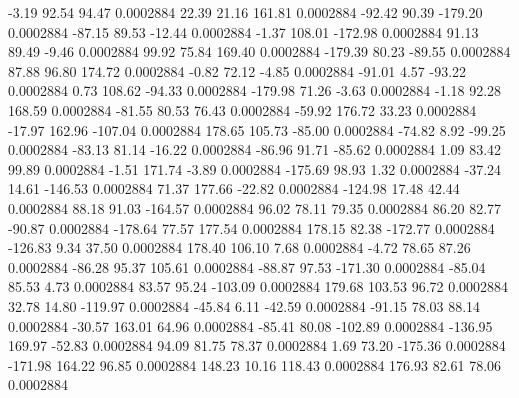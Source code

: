        -3.19       92.54       94.47     0.0002884
       22.39       21.16      161.81     0.0002884
      -92.42       90.39     -179.20     0.0002884
      -87.15       89.53      -12.44     0.0002884
       -1.37      108.01     -172.98     0.0002884
       91.13       89.49       -9.46     0.0002884
       99.92       75.84      169.40     0.0002884
     -179.39       80.23      -89.55     0.0002884
       87.88       96.80      174.72     0.0002884
       -0.82       72.12       -4.85     0.0002884
      -91.01        4.57      -93.22     0.0002884
        0.73      108.62      -94.33     0.0002884
     -179.98       71.26       -3.63     0.0002884
       -1.18       92.28      168.59     0.0002884
      -81.55       80.53       76.43     0.0002884
      -59.92      176.72       33.23     0.0002884
      -17.97      162.96     -107.04     0.0002884
      178.65      105.73      -85.00     0.0002884
      -74.82        8.92      -99.25     0.0002884
      -83.13       81.14      -16.22     0.0002884
      -86.96       91.71      -85.62     0.0002884
        1.09       83.42       99.89     0.0002884
       -1.51      171.74       -3.89     0.0002884
     -175.69       98.93        1.32     0.0002884
      -37.24       14.61     -146.53     0.0002884
       71.37      177.66      -22.82     0.0002884
     -124.98       17.48       42.44     0.0002884
       88.18       91.03     -164.57     0.0002884
       96.02       78.11       79.35     0.0002884
       86.20       82.77      -90.87     0.0002884
     -178.64       77.57      177.54     0.0002884
      178.15       82.38     -172.77     0.0002884
     -126.83        9.34       37.50     0.0002884
      178.40      106.10        7.68     0.0002884
       -4.72       78.65       87.26     0.0002884
      -86.28       95.37      105.61     0.0002884
      -88.87       97.53     -171.30     0.0002884
      -85.04       85.53        4.73     0.0002884
       83.57       95.24     -103.09     0.0002884
      179.68      103.53       96.72     0.0002884
       32.78       14.80     -119.97     0.0002884
      -45.84        6.11      -42.59     0.0002884
      -91.15       78.03       88.14     0.0002884
      -30.57      163.01       64.96     0.0002884
      -85.41       80.08     -102.89     0.0002884
     -136.95      169.97      -52.83     0.0002884
       94.09       81.75       78.37     0.0002884
        1.69       73.20     -175.36     0.0002884
     -171.98      164.22       96.85     0.0002884
      148.23       10.16      118.43     0.0002884
      176.93       82.61       78.06     0.0002884
